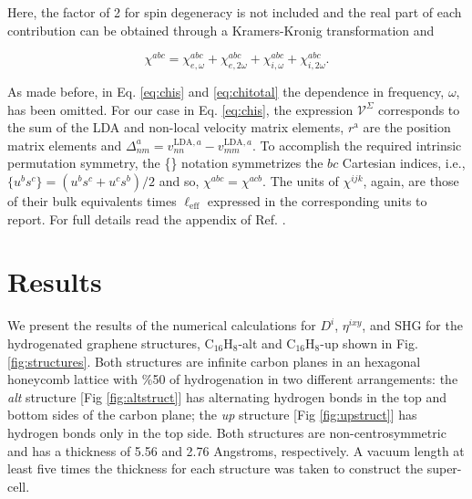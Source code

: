 \documentclass[aps,pra,11pt,tightenlines,showpacs,superscriptaddress,groupedaddress]{revtex4-1}
\newcommand{\di}{$D^{i}$}
\newcommand{\ea}{$\eta^{ixy}$}
\newcommand{\altstc}{C$_{16}$H$_{8}$-alt}
\newcommand{\upstc}{C$_{16}$H$_{8}$-up}
\begin{document}
\noindent Here, the factor of 2 for spin degeneracy is not included and the
real part of each contribution can be obtained through a Kramers-Kronig
transformation \cite{tancogne2014effect} and

\begin{equation}\label{eq:chitotal}
    \chi^{abc} = \chi^{abc}_{e,\omega} + \chi^{abc}_{e,2\omega} +
    \chi^{abc}_{i,\omega} + \chi^{abc}_{i,2\omega}
    .
\end{equation}

As made before, in Eq. \ref{eq:chis} and \ref{eq:chitotal} the dependence in
frequency, $\omega$, has been omitted. For our case in Eq. \ref{eq:chis}, the
expression $\mathcal{V}^{\Sigma}$ corresponds to the sum of the LDA and 
non-local velocity matrix elements, $r^{\mathrm{a}} $ are the position matrix
elements and $\Delta^{a}_{nm} = v^{\text{LDA},a}_{nn} - v^{\text{LDA},a}_{mm}
$. To accomplish the required intrinsic permutation symmetry, the \{\} notation
symmetrizes the $bc$ Cartesian indices, i.e., $\{u^{b}s^{c}\} = (u^{b}s^{c} +
u^{c}s^{b})/{2}$ and so, $\chi^{abc} = \chi^{acb}$. The units of $\chi^{ijk} $,
again, are those of their bulk equivalents times $\ell_{\text{eff}}$ expressed
in the corresponding units to report. For full details read the appendix of
Ref. \cite{anderson2015theory}.







\section{Results} %
\label{sec:results}

We present the results of the numerical calculations for \di, \ea, and SHG for
the hydrogenated graphene structures, {\altstc} and {\upstc} shown in Fig.
\ref{fig:structures}. Both structures are infinite carbon planes in an
hexagonal honeycomb lattice with \%50 of hydrogenation in two different
arrangements: the \emph{alt} structure [Fig \ref{fig:altstruct}] has
alternating hydrogen bonds in the top and bottom sides of the carbon plane; the
\emph{up} structure [Fig \ref{fig:upstruct}] has hydrogen bonds only in the top
side. Both structures are non-centrosymmetric and has a thickness of 5.56 and
2.76 Angstroms, respectively. A vacuum length at least  five times the
thickness for each structure was taken to construct the super-cell.
\end{document}
